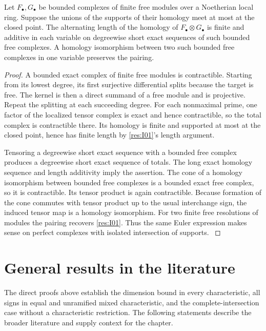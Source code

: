 \begin{proposition}\label{res:I17}
Let \(F_\bullet,G_\bullet\) be bounded complexes of finite
free modules over a Noetherian local ring. Suppose the unions
of the supports of their homology meet at most at the closed
point. The alternating length of the homology of
\(F_\bullet\otimes G_\bullet\) is finite and additive in
each variable on degreewise short exact sequences of such
bounded free complexes. A homology isomorphism between two
such bounded free complexes in one variable preserves the
pairing.
\end{proposition}
\begin{proof}
A bounded exact complex of finite free modules is contractible.
Starting from its lowest degree, its first surjective
differential splits because the target is free. The kernel is
then a direct summand of a free module and is projective.
Repeat the splitting at each succeeding degree. For each
nonmaximal prime, one factor of the localized tensor complex
is exact and hence contractible, so the total complex is
contractible there. Its homology is finite and supported at
most at the closed point, hence has finite length by
\ref{res:I01}'s length argument.

Tensoring a degreewise short exact sequence with a bounded free
complex produces a degreewise short exact sequence of totals.
The long exact homology sequence and length additivity imply
the assertion. The cone of a homology isomorphism between
bounded free complexes is a bounded exact free complex, so
it is contractible. Its tensor product is again contractible.
Because formation of the cone commutes with tensor product
up to the usual interchange sign, the induced tensor map
is a homology isomorphism. For two finite free resolutions
of modules the pairing recovers \ref{res:I01}. Thus the
same Euler expression makes sense on perfect complexes
with isolated intersection of supports.
\cite[Chapter 5, \S 5.3, and Chapter 11]{roberts}
\end{proof}

\section{General results in the literature}

The direct proofs above establish the dimension bound
in every characteristic, all signs in equal and unramified
mixed characteristic, and the complete-intersection case without
a characteristic restriction. The following statements describe
the broader literature and supply context for the chapter.

